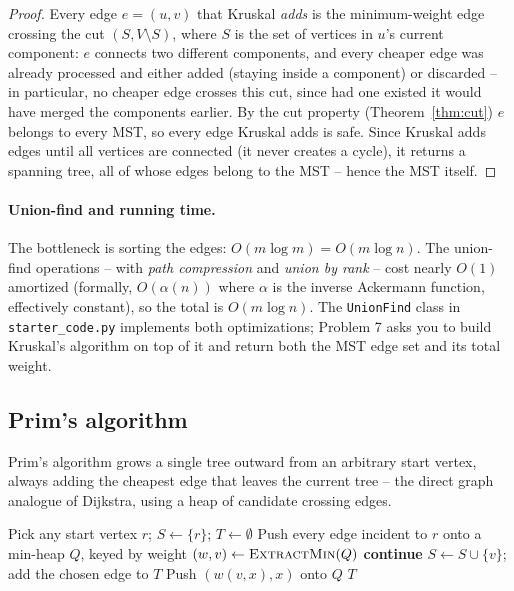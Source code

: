 \documentclass[11pt]{article}
\begin{document}
\begin{proof}
Every edge $e = (u,v)$ that Kruskal \emph{adds} is the minimum-weight edge
crossing the cut $(S, V \setminus S)$, where $S$ is the set of vertices in $u$'s
current component: $e$ connects two different components, and every cheaper edge
was already processed and either added (staying inside a component) or
discarded -- in particular, no cheaper edge crosses this cut, since had one
existed it would have merged the components earlier. By the cut property
(Theorem~\ref{thm:cut}) $e$ belongs to every MST, so every edge Kruskal adds is
safe. Since Kruskal adds edges until all vertices are connected (it never creates
a cycle), it returns a spanning tree, all of whose edges belong to the MST --
hence the MST itself.
\end{proof}

\paragraph{Union-find and running time.} The bottleneck is sorting the edges:
$O(m \log m) = O(m \log n)$. The union-find operations -- with \emph{path
compression} and \emph{union by rank} -- cost nearly $O(1)$ amortized (formally,
$O(\alpha(n))$ where $\alpha$ is the inverse Ackermann function, effectively
constant), so the total is $O(m \log n)$. The \texttt{UnionFind} class in
\texttt{starter\_code.py} implements both optimizations; Problem 7 asks you to
build Kruskal's algorithm on top of it and return both the MST edge set and its
total weight.

\subsection{Prim's algorithm}

Prim's algorithm grows a single tree outward from an arbitrary start vertex,
always adding the cheapest edge that leaves the current tree -- the direct graph
analogue of Dijkstra, using a heap of candidate crossing edges.

\begin{algorithm}[h]
\caption{Prim's Minimum Spanning Tree}
\begin{algorithmic}[1]
\State Pick any start vertex $r$; \quad $S \gets \{r\}$; \quad $T \gets \emptyset$
\State Push every edge incident to $r$ onto a min-heap $Q$, keyed by weight
    \State $(w, v) \gets \textsc{ExtractMin}(Q)$ 
     \textbf{continue} 
    \EndIf
    \State $S \gets S \cup \{v\}$; \quad add the chosen edge to $T$
        \State Push $(w(v,x), x)$ onto $Q$
    \EndFor
\EndWhile
\State \Return $T$
\end{algorithmic}
\end{algorithm}
\end{document}
